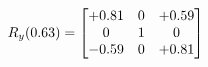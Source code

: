 \documentclass[preview]{standalone}
\begin{document}
\begin{align*}
\special{dvisvgm:raw <g id='unique000'>}R_{y}(0.63) = \begin{bmatrix}+0.81 & 0 & +0.59 \\0 & 1 & 0 \\-0.59 & 0 & +0.81\end{bmatrix}\special{dvisvgm:raw </g>}
\end{align*}
\end{document}
